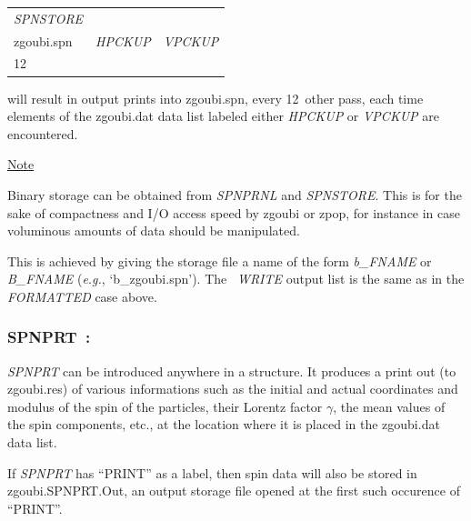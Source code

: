 {\renewcommand{\arraystretch}{1}
\begin{tabular}{lll}
	\textsl{SPNSTORE} &  &   \\
	zgoubi.spn \index{zgoubi.fai} & \textsl{HPCKUP} & \textsl{VPCKUP}  \\
	12 &  & 
\end{tabular}}

\medskip

\noindent will result in output prints into zgoubi.spn, every 12~other 
pass, each time elements of the zgoubi.dat  data list labeled either \textsl{HPCKUP}
or \textsl{VPCKUP} are encountered.

\medskip

\noindent\underline{Note}

\medskip

\noindent Binary storage can be obtained from \textsl{SPNPRNL} and \textsl{SPNSTORE}. This is for 
the sake of compactness and I/O access speed by zgoubi  or zpop, for instance  in case  voluminous amounts of 
data should be manipulated. 

\noindent This is achieved by giving the storage file a name of the form \textsl{b\_FNAME} 
or \textsl{B\_FNAME}  (\emph{e.g.}, `b\_zgoubi.spn'). The \FORTRAN\ \textsl{WRITE} output list 
is the same as in the \textsl{FORMATTED} case above.  







\newpage

\subsubsection*{SPNPRT~: \SPNPRTTitl}\label{SPNPRT}
\medskip 

\noindent  \textsl{SPNPRT} can be introduced anywhere in a structure. It produces
a print out (to zgoubi.res) of various informations such as 
the initial and actual coordinates and modulus of the spin of the \IMAX{}
particles, their Lorentz factor $\gamma$, 
the mean values of the spin components, etc.,  at the location where it is placed in the zgoubi.dat data list.

\medskip


\noindent  If \textsl{SPNPRT} has ``PRINT'' as a label, then spin data will also be stored in 
zgoubi.SPNPRT.Out, an output storage file opened at the first such occurence of ``PRINT''. 



